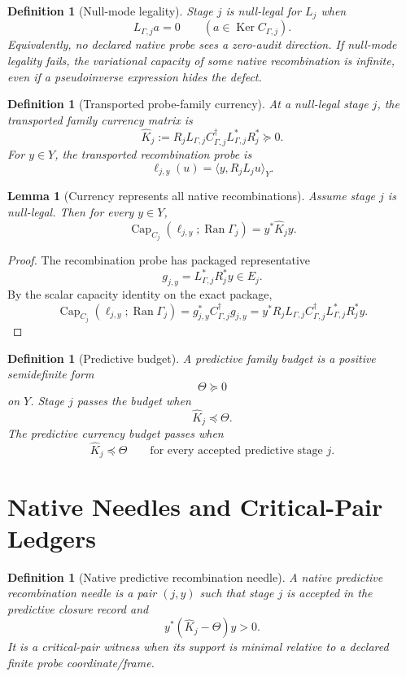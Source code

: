 \documentclass[11pt]{article}
\newtheorem{lemma}[theorem]{Lemma}
\newtheorem{definition}[theorem]{Definition}
\newcommand{\Range}{\operatorname{Ran}}
\newcommand{\Null}{\operatorname{Ker}}
\newcommand{\Capacity}{\operatorname{Cap}}
\begin{document}
\begin{definition}[Null-mode legality]
Stage $j$ is null-legal for $L_j$ when
\[
  L_{\Gamma,j}a=0\qquad (a\in\Null C_{\Gamma,j}).
\]
Equivalently, no declared native probe sees a zero-audit direction.  If null-mode legality fails, the variational capacity of some native recombination is infinite, even if a pseudoinverse expression hides the defect.
\end{definition}

\begin{definition}[Transported probe-family currency]
At a null-legal stage $j$, the transported family currency matrix is
\[
  \widehat K_j
  :=R_jL_{\Gamma,j}C_{\Gamma,j}^{\dagger}L_{\Gamma,j}^*R_j^*\succeq0.
\]
For $y\in Y$, the transported recombination probe is
\[
  \ell_{j,y}(u)=\langle y,R_jL_j u\rangle_Y.
\]
\end{definition}

\begin{lemma}[Currency represents all native recombinations]
Assume stage $j$ is null-legal.  Then for every $y\in Y$,
\[
  \Capacity_{C_j}(\ell_{j,y};\Range\Gamma_j)=y^*\widehat K_j y.
\]
\end{lemma}

\begin{proof}
The recombination probe has packaged representative
\[
  g_{j,y}=L_{\Gamma,j}^*R_j^*y\in E_j.
\]
By the scalar capacity identity on the exact package,
\[
\Capacity_{C_j}(\ell_{j,y};\Range\Gamma_j)
  =g_{j,y}^*C_{\Gamma,j}^{\dagger}g_{j,y}
  =y^*R_jL_{\Gamma,j}C_{\Gamma,j}^{\dagger}L_{\Gamma,j}^*R_j^*y.
\]
\end{proof}

\begin{definition}[Predictive budget]
A predictive family budget is a positive semidefinite form
\[
  \Theta\succeq0
\]
on $Y$.  Stage $j$ passes the budget when
\[
  \widehat K_j\preceq\Theta.
\]
The predictive currency budget passes when
\[
  \widehat K_j\preceq\Theta
  \qquad\text{for every accepted predictive stage }j.
\]
\end{definition}

\section{Native Needles and Critical-Pair Ledgers}

\begin{definition}[Native predictive recombination needle]
A native predictive recombination needle is a pair $(j,y)$ such that stage $j$ is accepted in the predictive closure record and
\[
  y^*(\widehat K_j-\Theta)y>0.
\]
It is a \emph{critical-pair witness} when its support is minimal relative to a declared finite probe coordinate/frame.
\end{definition}
\end{document}
